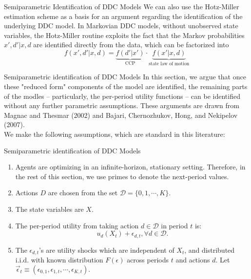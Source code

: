 \begin{frame}{Semiparametric Identification of DDC Models}
\vspace{3mm}
We can also use the Hotz-Miller estimation scheme as a basis for an argument regarding the identification of the underlying DDC model. In Markovian DDC models, without unobserved state variables, the Hotz-Miller routine exploits the fact that the Markov probabilities $x', d'|x, d$ are identified directly from the data, which can be factorized into
\begin{equation}
f(x',d'|x,d) = \underbrace{f(d'|x')}_{\text{CCP}} \cdot \underbrace{f(x'|x,d)}_{\text{state law of motion}}
\end{equation}
\end{frame}

\begin{frame}{Semiparametric identification of DDC Models}
In this section, we argue that once these "reduced form" components of the model are identified, the remaining parts of the modles -- particularly, the per-period utility functions -- can be identified without any further parametric assumptions. These arguments are drawn from Magnac and Thesmar (2002) and Bajari, Chernozhukov, Hong, and Nekipelov (2007).\\
We make the following assumptions, which are standard in this literature:
\end{frame}

\begin{frame}{Semiparametric identification of DDC Models}
\begin{enumerate}
\item Agents are optimizing in an infinite-horizon, stationary setting. Therefore, in the rest of this section, we use primes to denote the next-period values. 
\item Actions $D$ are chosen from the set $\mathcal{D} = \{0,1, \cdots, K\}$.
\item The state variables are $X$.
\item The per-period utility from taking action $d \in \mathcal{D}$ in period $t$ is:
\begin{equation*}
u_d(X_t) +\epsilon_{d,t}, \forall d \in \mathcal{D}.
\end{equation*}
\item The $\epsilon_{d,t}$'s are utility shocks which are independent of $X_t$, and distributed i.i.d. with known distribution $F(\epsilon)$ across periods $t$ and actions $d$. Let $\vec \epsilon_t \equiv (\epsilon_{0,1}, \epsilon_{1,t}, \cdots, \epsilon_{K,t}).$ \\
\end{enumerate}
\end{frame}

